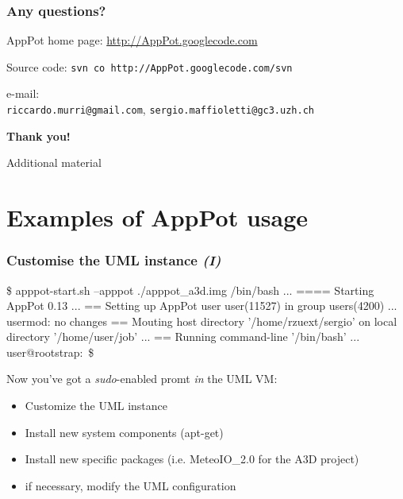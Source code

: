 \documentclass{beamer}
\begin{document}
\begin{frame}
  \frametitle{Any questions?}
  \label{sec:23}
  \begin{center}
    AppPot home page: \href{http://AppPot.googlecode.com}{http://AppPot.googlecode.com}

    \+
    Source code: \texttt{svn co http://AppPot.googlecode.com/svn}
    
    \+
    e-mail: \\ 
    \texttt{riccardo.murri@gmail.com}, \texttt{sergio.maffioletti@gc3.uzh.ch}
    
    \+
    \textbf{Thank you!}
  \end{center}
\end{frame}


\appendix
\begin{frame}
  \begin{center}
    {\Huge Additional material}
  \end{center}
\end{frame}

\section{Examples of AppPot usage}

\begin{frame}[fragile]
  \frametitle{Customise the UML instance \emph{(I)}}
\begin{semiverbatim}
\$ apppot-start.sh --apppot ./apppot\_a3d.img /bin/bash
...
==== Starting AppPot 0.13 ...
== Setting up AppPot user user(11527) in group users(4200) ...
usermod: no changes
== Mouting host directory '/home/rzuext/sergio' on local directory '/home/user/job' ...
== Running command-line '/bin/bash' ...
user@rootstrap:~\$ 
\end{semiverbatim}

Now you've got a \emph{sudo}-enabled promt \emph{in} the UML VM:
\begin{itemize}
  \item Customize the UML instance
  \item Install new system components (apt-get)
  \item Install new specific packages (i.e. MeteoIO\_2.0 for the A3D project)
  \item if necessary, modify the UML configuration
\end{itemize}
\end{frame}
\end{document}
